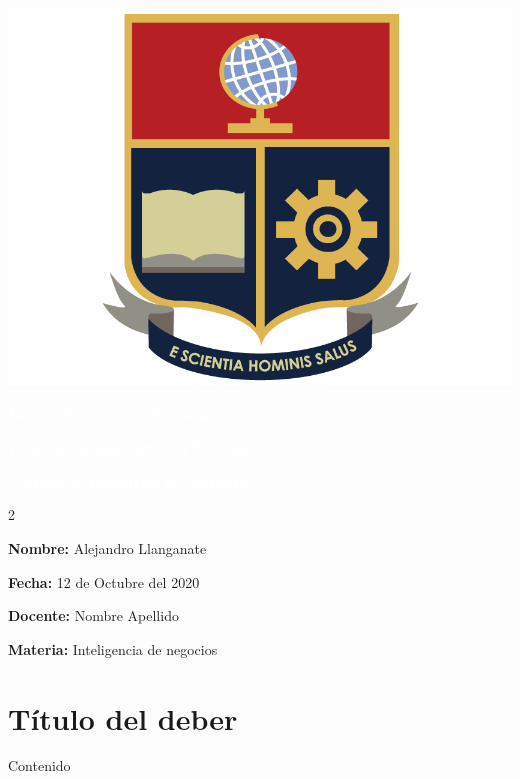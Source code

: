 \documentclass[12pt, a4paper]{article}
\begin{document}
\BgThispage
\begin{multicols}{2}
    \begin{center}
        \includegraphics[scale=0.09]{logo-epn.png}
    \end{center}
    \vfill\null
    \columnbreak
    \par
    \vspace*{-0.3cm}
    \textcolor{white}{\bf{Escuela Politécnica Nacional}} \par
    \textcolor{white}{\bf{Facultad de Ingeniería en Sistemas}} \par
    \textcolor{white}{\bf{Carrera de Ingeniería de Software}} \par
    \vfill\null
    \columnbreak
\end{multicols}
\vspace*{0.2cm}
\begin{multicols} {2}
{
\textbf{Nombre:} Alejandro Llanganate \par
\textbf{Fecha:} 12 de Octubre del 2020
\vfill\null
\columnbreak

\noindent\textbf{Docente:} Nombre Apellido \par
\textbf{Materia:} Inteligencia de negocios
}
\end{multicols}

{\centering\section*{Título del deber}}
Contenido
\end{document}
